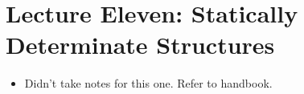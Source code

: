 \section{Lecture Eleven: Statically Determinate Structures}
\begin{itemize}
    \item Didn't take notes for this one. Refer to handbook.
\end{itemize}